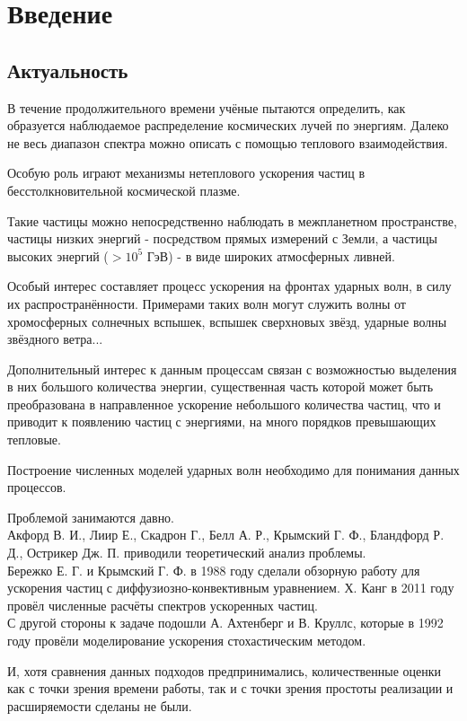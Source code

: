\documentclass[a4paper,14pt]{extarticle} %
\begin{document}
\section{Введение}
\subsection{Актуальность}
В течение продолжительного времени учёные пытаются определить, как образуется наблюдаемое распределение космических лучей по энергиям. Далеко не весь диапазон спектра можно описать с помощью теплового взаимодействия.

Особую роль играют механизмы нетеплового ускорения частиц в бесстолкновительной космической плазме. 

Такие частицы можно непосредственно наблюдать в межпланетном пространстве, частицы низких энергий - посредством прямых измерений  с Земли, а частицы высоких энергий ($>10^5$ ГэВ) - в виде широких атмосферных ливней.

Особый интерес составляет процесс ускорения на фронтах ударных волн, в силу их распространённости.
Примерами таких волн могут служить волны от хромосферных солнечных вспышек, вспышек сверхновых звёзд, ударные волны звёздного ветра...

Дополнительный интерес к данным процессам связан с возможностью выделения в них большого количества энергии, существенная часть которой может быть преобразована в направленное ускорение небольшого количества частиц, что и приводит к появлению частиц с энергиями, на много порядков превышающих тепловые.

Построение численных моделей ударных волн необходимо для понимания данных процессов.

Проблемой занимаются давно.\\
Акфорд В. И., Лиир Е., Скадрон Г.\cite{ALS},  Белл А. Р.\cite{Bell1}\cite{Bell2}, Крымский Г. Ф.\cite{Crim}, Бландфорд Р. Д., Острикер Дж. П.\cite{BO} приводили теоретический анализ проблемы.\\
 Бережко Е. Г. и Крымский Г. Ф.\cite{berezhko} в 1988 году сделали обзорную работу для ускорения частиц с диффузиозно-конвективным уравнением. Х. Канг\cite{Kang} в 2011 году провёл численные расчёты спектров ускоренных частиц. \\ 
С другой стороны к задаче подошли А. Ахтенберг и В. Круллс\cite{Krulls}, которые в 1992 году провёли моделирование ускорения стохастическим методом.

И, хотя сравнения данных подходов предпринимались, количественные оценки как с точки зрения времени работы, так и с точки зрения простоты реализации и расширяемости сделаны не были.
\end{document}
